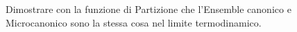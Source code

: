 \question  Dimostrare con la funzione di Partizione che l'Ensemble canonico e Microcanonico sono la stessa cosa nel limite termodinamico.
